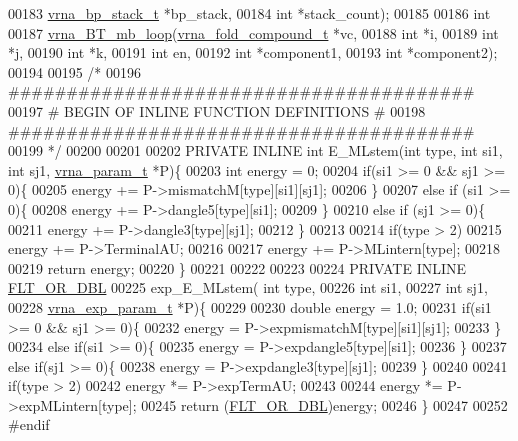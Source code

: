\begin{DoxyCode}
00183                       \hyperlink{group__data__structures_structvrna__bp__stack__s}{vrna\_bp\_stack\_t} *bp\_stack,
00184                       \textcolor{keywordtype}{int} *stack\_count);
00185 
00186 \textcolor{keywordtype}{int}
00187 \hyperlink{multibranch__loops_8h_a9cb520ddfd8b3a48089a7910b045d06b}{vrna\_BT\_mb\_loop}(\hyperlink{group__fold__compound_structvrna__fc__s}{vrna\_fold\_compound\_t} *vc,
00188                 \textcolor{keywordtype}{int} *i,
00189                 \textcolor{keywordtype}{int} *j,
00190                 \textcolor{keywordtype}{int} *k,
00191                 \textcolor{keywordtype}{int} en,
00192                 \textcolor{keywordtype}{int} *component1,
00193                 \textcolor{keywordtype}{int} *component2);
00194 
00195 \textcolor{comment}{/*}
00196 \textcolor{comment}{########################################}
00197 \textcolor{comment}{# BEGIN OF INLINE FUNCTION DEFINITIONS #}
00198 \textcolor{comment}{########################################}
00199 \textcolor{comment}{*/}
00200 
00201 
00202 PRIVATE INLINE \textcolor{keywordtype}{int} E\_MLstem(\textcolor{keywordtype}{int} type, \textcolor{keywordtype}{int} si1, \textcolor{keywordtype}{int} sj1, \hyperlink{group__energy__parameters_structvrna__param__s}{vrna\_param\_t} *P)\{
00203   \textcolor{keywordtype}{int} energy = 0;
00204   \textcolor{keywordflow}{if}(si1 >= 0 && sj1 >= 0)\{
00205     energy += P->mismatchM[type][si1][sj1];
00206   \}
00207   \textcolor{keywordflow}{else} \textcolor{keywordflow}{if} (si1 >= 0)\{
00208     energy += P->dangle5[type][si1];
00209   \}
00210   \textcolor{keywordflow}{else} \textcolor{keywordflow}{if} (sj1 >= 0)\{
00211     energy += P->dangle3[type][sj1];
00212   \}
00213 
00214   \textcolor{keywordflow}{if}(type > 2)
00215     energy += P->TerminalAU;
00216 
00217   energy += P->MLintern[type];
00218 
00219   \textcolor{keywordflow}{return} energy;
00220 \}
00221 
00222 
00223 
00224 PRIVATE INLINE \hyperlink{group__data__structures_ga31125aeace516926bf7f251f759b6126}{FLT\_OR\_DBL}
00225 exp\_E\_MLstem( \textcolor{keywordtype}{int} type,
00226               \textcolor{keywordtype}{int} si1,
00227               \textcolor{keywordtype}{int} sj1,
00228               \hyperlink{group__energy__parameters_structvrna__exp__param__s}{vrna\_exp\_param\_t} *P)\{
00229 
00230   \textcolor{keywordtype}{double} energy = 1.0;
00231   \textcolor{keywordflow}{if}(si1 >= 0 && sj1 >= 0)\{
00232     energy = P->expmismatchM[type][si1][sj1];
00233   \}
00234   \textcolor{keywordflow}{else} \textcolor{keywordflow}{if}(si1 >= 0)\{
00235     energy = P->expdangle5[type][si1];
00236   \}
00237   \textcolor{keywordflow}{else} \textcolor{keywordflow}{if}(sj1 >= 0)\{
00238     energy = P->expdangle3[type][sj1];
00239   \}
00240 
00241   \textcolor{keywordflow}{if}(type > 2)
00242     energy *= P->expTermAU;
00243 
00244   energy *= P->expMLintern[type];
00245   \textcolor{keywordflow}{return} (\hyperlink{group__data__structures_ga31125aeace516926bf7f251f759b6126}{FLT\_OR\_DBL})energy;
00246 \}
00247 
00252 \textcolor{preprocessor}{#endif}
\end{DoxyCode}
